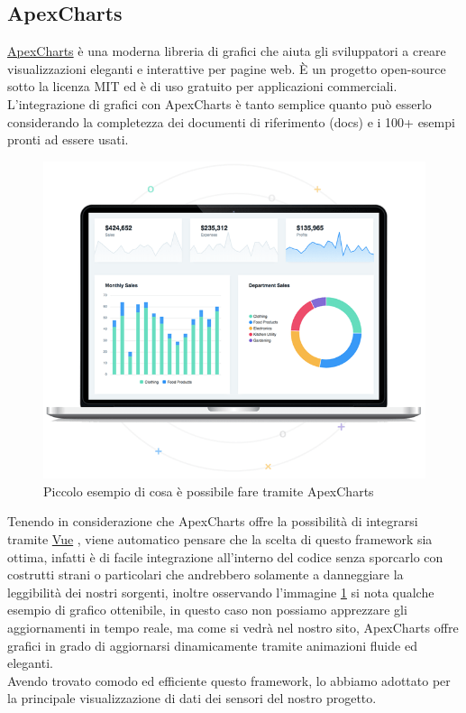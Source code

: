 \documentclass{article}
\newcommand{\vue}{\href{https://vuejs.org/}{Vue} }
\newcommand{\apexcharts}{\href{https://apexcharts.com/}{ApexCharts} }
\begin{document}
\subsection{ApexCharts}
\apexcharts è una moderna libreria di grafici che aiuta gli sviluppatori a creare visualizzazioni eleganti e interattive per pagine web. È un progetto open-source sotto la licenza MIT ed è di uso gratuito per applicazioni commerciali.\\
L'integrazione di grafici con ApexCharts è tanto semplice quanto può esserlo considerando la completezza dei documenti di riferimento (docs) e i 100+ esempi pronti ad essere usati.\\
\begin{figure}[h!]
	\centering
	\includegraphics[scale=0.7]{apexchart.png}
	\caption{Piccolo esempio di cosa è possibile fare tramite ApexCharts}
	\label{fig:apexchart}
\end{figure}
Tenendo in considerazione che ApexCharts offre la possibilità di integrarsi tramite \vue, viene automatico pensare che la scelta di questo framework sia ottima, infatti è di facile integrazione all'interno del codice senza sporcarlo con costrutti strani o particolari che andrebbero solamente a danneggiare la leggibilità dei nostri sorgenti, inoltre osservando l'immagine \ref{fig:apexchart} si nota qualche esempio di grafico ottenibile, in questo caso non possiamo apprezzare gli aggiornamenti in tempo reale, ma come si vedrà nel nostro sito, ApexCharts offre grafici in grado di aggiornarsi dinamicamente tramite animazioni fluide ed eleganti.\\
Avendo trovato comodo ed efficiente questo framework, lo abbiamo adottato per la principale visualizzazione di dati dei sensori del nostro progetto.
\end{document}
